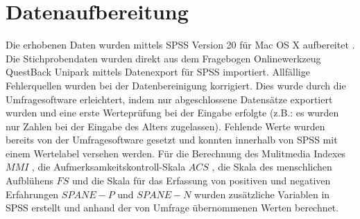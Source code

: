\section{Datenaufbereitung}\label{section.datenaufbereitung}
Die erhobenen Daten wurden mittels SPSS Version 20 für Mac OS X aufbereitet \cite{Spss2011}. Die Stichprobendaten wurden direkt aus dem Fragebogen Onlinewerkzeug QuestBack Unipark \cite{QuestBack2014} mittels Datenexport für SPSS importiert. Allfällige Fehlerquellen wurden bei der Datenbereinigung korrigiert. Dies wurde durch die Umfragesoftware erleichtert, indem nur abgeschlossene Datensätze exportiert wurden und eine erste Werteprüfung bei der Eingabe erfolgte (z.B.: es wurden nur Zahlen bei der Eingabe des Alters zugelassen). Fehlende Werte wurden bereits von der Umfragesoftware gesetzt und konnten innerhalb von SPSS mit einem Wertelabel versehen werden. Für die Berechnung des Mulitmedia Indexes $MMI$ \cite{Ophir2009}, die Aufmerksamkeitskontroll-Skala  $ACS$ \cite{Posner1998}, die Skala des menschlichen Aufblühens $FS$ \cite{Diener:2010} und die Skala für das Erfassung von positiven und negativen Erfahrungen $SPANE-P$ und $SPANE-N$ \cite{Diener:2010} wurden zusätzliche Variablen in SPSS erstellt und anhand der von Umfrage übernommenen Werten berechnet. 

